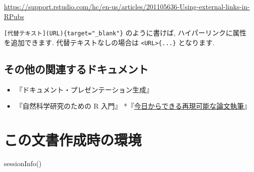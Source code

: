 \documentclass[
]{ltjsarticle}
\newenvironment{Shaded}{\begin{snugshade}}{\end{snugshade}}
\newcommand{\FunctionTok}[1]{\textcolor[rgb]{0.00,0.00,0.00}{#1}}
\newcommand{\NormalTok}[1]{#1}
\providecommand{\tightlist}{%
  \setlength{\itemsep}{0pt}\setlength{\parskip}{0pt}}
\begin{document}
\url{https://support.rstudio.com/hc/en-us/articles/201105636-Using-external-links-in-RPubs}

\texttt{{[}代替テキスト{]}(URL)\{target="\_blank"\}} のように書けば, ハイパーリンクに属性を追加できます. 代替テキストなしの場合は \texttt{\textless{}URL\textgreater{}\{...\}} となります.

\hypertarget{ux305dux306eux4ed6ux306eux95a2ux9023ux3059ux308bux30c9ux30adux30e5ux30e1ux30f3ux30c8}{%
\subsection{その他の関連するドキュメント}\label{ux305dux306eux4ed6ux306eux95a2ux9023ux3059ux308bux30c9ux30adux30e5ux30e1ux30f3ux30c8}}

\begin{itemize}
\tightlist
\item
  \citet{KinTakahashi2014} 『ドキュメント・プレゼンテーション生成』
\item
  \citet{Eguchi2018} 『自然科学研究のための R 入門』
  *『\href{https://ykunisato.github.io/jpa2020-tws-002/}{今日からできる再現可能な論文執筆}』
\end{itemize}

\hypertarget{ux3053ux306eux6587ux66f8ux4f5cux6210ux6642ux306eux74b0ux5883}{%
\section*{この文書作成時の環境}\label{ux3053ux306eux6587ux66f8ux4f5cux6210ux6642ux306eux74b0ux5883}}

\begin{Shaded}
\begin{Highlighting}[numbers=left,,]
\FunctionTok{sessionInfo}\NormalTok{()}
\end{Highlighting}
\end{Shaded}
\end{document}

